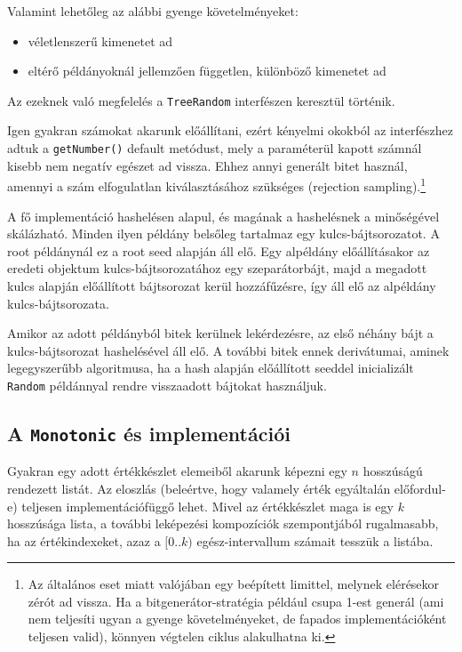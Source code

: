 \documentclass[
    parspace,
    noindent,
    nohyp,
]{elteiktdk}[2023/04/10]
\begin{document}
Valamint lehetőleg az alábbi gyenge követelményeket:

\begin{itemize}
   \item véletlenszerű kimenetet ad
   \item eltérő példányoknál jellemzően független, különböző kimenetet ad
\end{itemize}

Az ezeknek való megfelelés a \texttt{TreeRandom} interfészen keresztül történik.

Igen gyakran számokat akarunk előállítani,
ezért kényelmi okokból az interfészhez adtuk a \texttt{getNumber()} default metódust,
mely a paraméterül kapott számnál kisebb nem negatív egészet ad vissza.
Ehhez annyi generált bitet használ,
amennyi a szám elfogulatlan kiválasztásához szükséges (rejection sampling).\footnote{
  Az általános eset miatt valójában egy beépített limittel, melynek elérésekor zérót ad vissza.
  Ha a bitgenerátor-stratégia például csupa 1-est generál
  (ami nem teljesíti ugyan a gyenge követelményeket, de fapados implementációként teljesen valid),
  könnyen végtelen ciklus alakulhatna ki.
}

A fő implementáció hashelésen alapul, és magának a hashelésnek a minőségével skálázható.
Minden ilyen példány belsőleg tartalmaz egy kulcs-bájtsorozatot.
A root példánynál ez a root seed alapján áll elő.
Egy alpéldány előállításakor az eredeti objektum kulcs-bájtsorozatához egy szeparátorbájt,
majd a megadott kulcs alapján előállított bájtsorozat kerül hozzáfűzésre,
így áll elő az alpéldány kulcs-bájtsorozata.

Amikor az adott példányból bitek kerülnek lekérdezésre,
az első néhány bájt a kulcs-bájtsorozat hashelésével áll elő.
A további bitek ennek derivátumai, aminek legegyszerűbb algoritmusa,
ha a hash alapján előállított seeddel inicializált \texttt{Random} példánnyal
rendre visszaadott bájtokat használjuk.

\subsection{A \texttt{Monotonic} és implementációi}

Gyakran egy adott értékkészlet elemeiből akarunk képezni egy $n$ hosszúságú rendezett listát.
Az eloszlás (beleértve, hogy valamely érték egyáltalán előfordul-e)
teljesen implementációfüggő lehet.
Mivel az értékkészlet maga is egy $k$ hosszúsága lista,
a további leképezési kompozíciók szempontjából rugalmasabb,
ha az értékindexeket, azaz a $[0..k)$ egész-intervallum számait tesszūk a listába.
\end{document}
